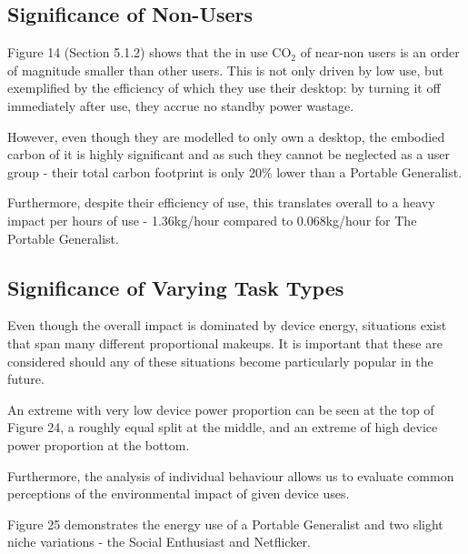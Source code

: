 \documentclass[conference]{IEEEtran}
\begin{document}
\subsection{Significance of Non-Users}

Figure 14 (Section 5.1.2) shows that the in use CO$_2$ of near-non users
is an order of magnitude smaller than other users. This is not only
driven by low use, but exemplified by the efficiency of which they use
their desktop: by turning it off immediately after use, they accrue no
standby power wastage.

However, even though they are modelled to only own a desktop, the
embodied carbon of it is highly significant and as such they cannot be
neglected as a user group - their total carbon footprint is only 20\%
lower than a Portable Generalist.

Furthermore, despite their efficiency of use, this translates overall
to a heavy impact per hours of use - 1.36kg/hour compared to
0.068kg/hour for The Portable Generalist.

\subsection{Significance of Varying Task Types}

Even though the overall impact is dominated by device energy,
situations exist that span many different proportional makeups. It is
important that these are considered should any of these situations
become particularly popular in the future.

An extreme with very low device power proportion can be seen at the
top of Figure 24, a roughly equal split at the middle, and an extreme
of high device power proportion at the bottom.

Furthermore, the analysis of individual behaviour allows us to
evaluate common perceptions of the environmental impact of given
device uses.

Figure 25 demonstrates the energy use of a Portable Generalist and two
slight niche variations - the Social Enthusiast and Netflicker.
\end{document}
